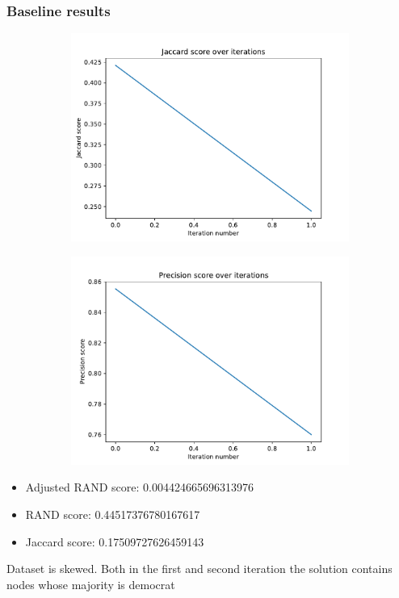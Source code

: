 \documentclass{beamer}
\begin{document}
\begin{frame}[c]
	\frametitle{Baseline results}

	\begin{figure}
		\begin{center}
			\begin{subfigure}[b]{0.4\textwidth}
				\centering
				\includegraphics[width=\textwidth]{out/nytimes_baseline200/jaccard_iterations.pdf}
			\end{subfigure}
			\begin{subfigure}[b]{0.4\textwidth}
				\centering
				\includegraphics[width=\textwidth]{out/nytimes_baseline200/precision_iterations.pdf}
			\end{subfigure}
		\end{center}
	\end{figure}

	\begin{itemize}
		\item Adjusted RAND score: 0.004424665696313976
		\item RAND score: 0.44517376780167617
		\item Jaccard score: 0.17509727626459143
	\end{itemize}

	Dataset is skewed. Both in the first and second iteration the solution
	contains nodes whose majority is democrat

\end{frame}
\end{document}
